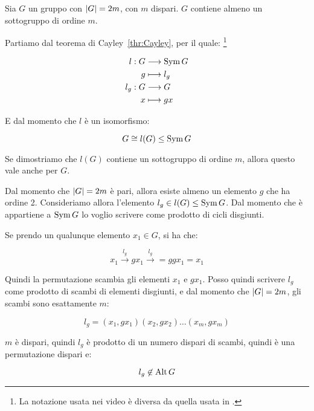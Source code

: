 \begin{teorema}
	Sia $G$ un gruppo con $\lvert G \rvert = 2m$, con $m$ dispari. $G$ contiene almeno un sottogruppo di ordine $m$.
\end{teorema}
\begin{dimostrazione}
	Partiamo dal teorema di Cayley~\ref{thr:Cayley}, per il quale:
	\footnote{La notazione usata nei video \cite{lucchini} è diversa da quella usata in \cite{jacobson}.}
	
	\begin{align}
		l: G &\longrightarrow \operatorname{Sym} G \\
		g &\longmapsto l_g \\
		l_g: G &\longrightarrow G \\
		x &\longmapsto gx
	\end{align}

	E dal momento che $l$ è un isomorfismo: 
	
	\begin{equation}
		G \cong l(G) \le \operatorname{Sym} G
	\end{equation}

	Se dimostriamo che $l(G)$ contiene un sottogruppo di ordine $m$, allora questo vale anche per $G$.
	
	Dal momento che $\lvert G \rvert = 2m$ è pari, allora esiste almeno un elemento $g$ che ha ordine 2. Consideriamo allora l'elemento $l_g \in l(G) \le \operatorname{Sym} G$. Dal momento che è appartiene a $\operatorname{Sym} G$ lo voglio scrivere come prodotto di cicli disgiunti.
	
	Se prendo un qualunque elemento $x_1 \in G$, si ha che:
	
	\begin{equation}
		x_1 \xrightarrow{l_g} gx_1 \xrightarrow{l_g} = ggx_1 = x_1
	\end{equation}

	Quindi la permutazione scambia gli elementi $x_1$ e $gx_1$. Posso quindi scrivere $l_g$ come prodotto di scambi di elementi disgiunti, e dal momento che $\lvert G \rvert = 2m$, gli scambi sono esattamente $m$:
	
	\begin{equation}
		l_g = (x_1, gx_1)(x_2, gx_2) \dots (x_m, gx_m)
	\end{equation}
	
	$m$ è dispari, quindi $l_g$ è prodotto di un numero dispari di scambi, quindi è una permutazione dispari e:
	
	\begin{equation}
		l_g \not\in \operatorname{Alt} G
	\end{equation}


\end{dimostrazione}
